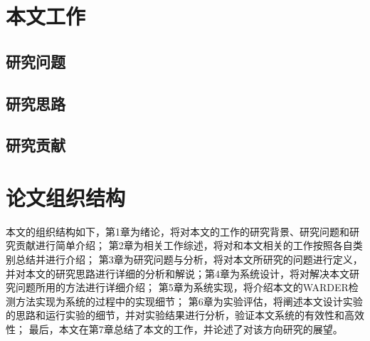 

\section{本文工作}

\subsection{研究问题}


\subsection{研究思路}


\subsection{研究贡献}


\section{论文组织结构}

本文的组织结构如下，第1章为绪论，将对本文的工作的研究背景、研究问题和研究贡献进行简单介绍；
第2章为相关工作综述，将对和本文相关的工作按照各自类别总结并进行介绍；
第3章为研究问题与分析，将对本文所研究的问题进行定义，并对本文的研究思路进行详细的分析和解说；第4章为系统设计，将对解决本文研究问题所用的方法进行详细介绍；
第5章为系统实现，将介绍本文的WARDER检测方法实现为系统的过程中的实现细节；
第6章为实验评估，将阐述本文设计实验的思路和运行实验的细节，并对实验结果进行分析，验证本文系统的有效性和高效性；
最后，本文在第7章总结了本文的工作，并论述了对该方向研究的展望。